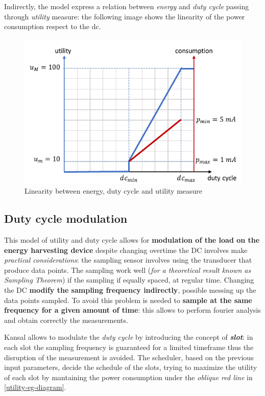 \documentclass[10pt,a4paper]{report}
\theoremstyle{definition}
\begin{document}
Indirectly, the model express a relation between \textit{energy} and \textit{duty cycle} passing through \textit{utility} measure: the following image shows the linearity of the power consumption respect to the dc.


\begin{figure}[h]
	\centering\includegraphics[scale=0.50]{images/Pasted image 20230509162726.png}
	\caption{Linearity between energy, duty cycle and utility measure}
	\label{energy-consumption-dc}
\end{figure}


\subsection{Duty cycle modulation}\label{sec:duty-cycle-modulation}
This model of utility and duty cycle allows for \textbf{modulation of the load on the energy harvesting device} despite changing overtime the DC involves make \textit{practical considerations}: the sampling sensor involves using the transducer that produce data points. The sampling work well (\textit{for a theoretical result known as Sampling Theorem}) if the sampling if equally spaced, at regular time.
Changing the DC \textbf{modify the sampling frequency indirectly}, possible messing up the data points sampled.
To avoid this problem is needed to \textbf{sample at the same frequency for a given amount of time}: this allows to perform fourier analysis and obtain correctly the measurements.

Kansal allows to modulate the \textit{duty cycle} by introducing the concept of \textit{\textbf{slot}}: in each slot the sampling frequency is guaranteed for a limited timeframe thus the disruption of the measurement is avoided.
The scheduler, based on the previous input parameters, decide the schedule of the slots, trying to maximize the utility of each slot by mantaining the power consumption under the \textit{oblique red line} in \ref{utility-eg-diagram}. 
\end{document}
